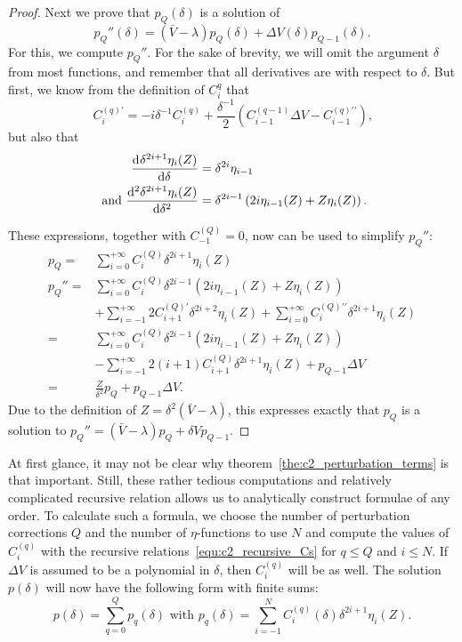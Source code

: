 \begin{proof}
Next we prove that $p_Q(\delta)$ is a solution of
$$
    p_Q''(\delta)  = (\bar{V} - \lambda) p_Q(\delta) + \Delta V(\delta) p_{Q-1}(\delta)\text{.}
$$
For this, we compute $p_Q''$. For the sake of brevity, we will omit the argument $\delta$ from most functions, and remember that all derivatives are with respect to $\delta$. But first, we know from the definition of $C_i^q$ that
$$
    C_i^{(q)\prime} = -i \delta^{-1} C_i^{(q)} + \frac{\delta^{-1}}{2}\left(C^{(q-1)}_{i-1}\Delta V - C^{(q)\prime\prime}_{i-1}\right)\text{,}
$$
but also that
\begin{align*}
    {\dv[]{\delta^{2i+1}\eta_i(Z)}{\delta}}               & = \delta^{2i} \eta_{i-1}                                         \\
    \text{ and } {\dv[2]{\delta^{2i+1}\eta_i(Z)}{\delta}} & = \delta^{2i-1}\left(2i\eta_{i-1}(Z) + Z\eta_i(Z)\right)\text{.}
\end{align*}

\begingroup
\allowdisplaybreaks
These expressions, together with $C_{-1}^{(Q)} = 0$, now can be used to simplify $p_Q''$:
\begin{align*}
    p_Q =   & \sum_{i=0}^{+\infty} C_{i}^{(Q)} \delta^{2i + 1} \eta_{i}(Z)                                                                              \\
    p_Q'' = & \sum_{i=0}^{+\infty} C_i^{(Q)}\delta^{2i-1}\left(2i\eta_{i-1}(Z) + Z\eta_i(Z)\right)                                                      \\
            & + \sum_{i=-1}^{+\infty} 2C_{i+1}^{(Q)\prime}\delta^{2i+2}\eta_{i}(Z) + \sum_{i=0}^{+\infty} C_i^{(Q)\prime\prime}\delta^{2i+1}\eta_{i}(Z) \\
    =       & \sum_{i=0}^{+\infty} C_i^{(Q)}\delta^{2i-1}\left(2i\eta_{i-1}(Z) + Z\eta_i(Z)\right)                                                      \\
            & - \sum_{i=-1}^{+\infty} 2(i+1)C_{i+1}^{(Q)}\delta^{2i+1}\eta_{i}(Z) + p_{Q-1} \Delta V                                                    \\
    =       & \frac{Z}{\delta^2}p_Q + p_{Q-1} \Delta V \text{.}
\end{align*}
\endgroup
Due to the definition of $Z = \delta^2(\bar{V} - \lambda)$, this expresses exactly that $p_Q$ is a solution to $p_Q'' = (\bar{V} - \lambda)p_Q + \delta V p_{Q-1}$.
\end{proof}

At first glance, it may not be clear why theorem~\ref{the:c2_perturbation_terms} is that important. Still, these rather tedious computations and relatively complicated recursive relation allows us to analytically construct formulae of any order. To calculate such a formula, we choose the number of perturbation corrections $Q$ and the number of $\eta$-functions to use $N$ and compute the values of $C_{i}^{(q)}$ with the recursive relations~\eqref{equ:c2_recursive_Cs} for $q \leq Q$ and $i \leq N$. If $\Delta V$ is assumed to be a polynomial in $\delta$, then $C_{i}^{(q)}$ will be as well. The solution $p(\delta)$ will now have the following form with finite sums:
$$
    p(\delta) = \sum_{q=0}^{Q} p_q(\delta) \text{ with } p_q(\delta) = \sum_{i=-1}^{N} C_{i}^{(q)}(\delta) \delta^{2i+1} \eta_i(Z) \text{.}
$$

